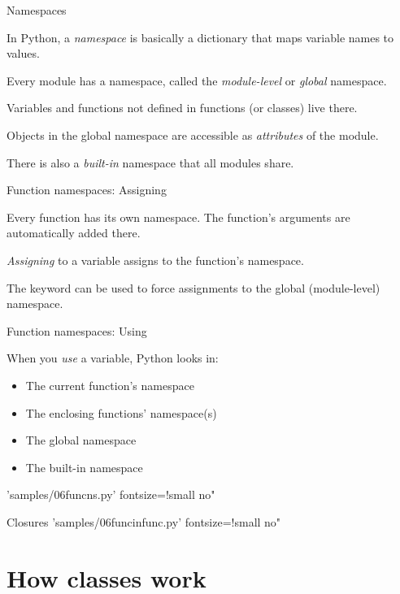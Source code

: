 \documentclass{pyslides}
\begin{document}
\begin{frame}[fragile]{Namespaces}

In Python, a \emph{namespace} is basically a dictionary that maps variable names to values.

Every module has a namespace, called the \emph{module-level} or \emph{global} namespace.

Variables and functions not defined in functions (or classes) live there.

Objects in the global namespace are accessible as \emph{attributes} of the module.

There is also a \emph{built-in} namespace that all modules share.

\end{frame}


\begin{frame}[fragile]{Function namespaces: Assigning}

Every function has its own namespace. The function's arguments are automatically added there.

\emph{Assigning} to a variable assigns to the function's namespace.

\bigskip

The  keyword can be used to force assignments to the global (module-level) namespace.
\end{frame}

\begin{frame}[fragile]{Function namespaces: Using}

When you \emph{use} a variable, Python looks in:
\begin{itemize}
\item The current function's namespace
\item The enclosing functions' namespace(s)
\item The global namespace
\item The built-in namespace
\end{itemize}

\bigskip

 'samples/06funcns.py' fontsize=!small no"
\end{frame}


\begin{frame}[fragile]{Closures}
 'samples/06funcinfunc.py' fontsize=!small no"
\end{frame}

\section{How classes work}
\end{document}
